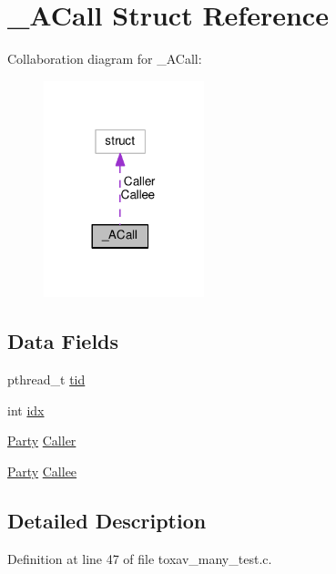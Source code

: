 \hypertarget{struct___a_call}{\section{\+\_\+\+A\+Call Struct Reference}
\label{struct___a_call}
}


Collaboration diagram for \+\_\+\+A\+Call\+:
\nopagebreak
\begin{figure}[H]
\begin{center}
\leavevmode
\includegraphics[width=132pt]{d0/dad/struct___a_call__coll__graph}
\end{center}
\end{figure}
\subsection*{Data Fields}
\begin{DoxyCompactItemize}
\item 
pthread\+\_\+t \hyperlink{struct___a_call_a3a5ba243b3ab4b6093afb178de0f9509}{tid}
\item 
int \hyperlink{struct___a_call_ae40354a1051342eb5a9db005715dcfa9}{idx}
\item 
\hyperlink{toxav__basic__test_8c_a6b3eabc1984dea93c1fe4b44079315f2}{Party} \hyperlink{struct___a_call_a51f82344f432ea82fc1a993d1f9cb018}{Caller}
\item 
\hyperlink{toxav__basic__test_8c_a6b3eabc1984dea93c1fe4b44079315f2}{Party} \hyperlink{struct___a_call_ac9f376aa53c5e8c50a3ebd11c377f0dd}{Callee}
\end{DoxyCompactItemize}


\subsection{Detailed Description}


Definition at line 47 of file toxav\+\_\+many\+\_\+test.\+c.



